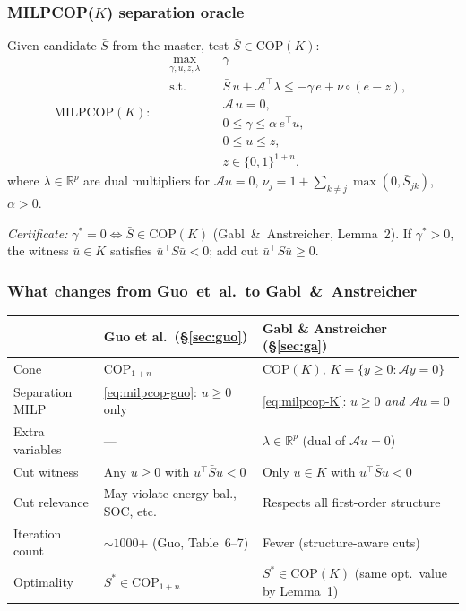\documentclass[11pt]{article}
\theoremstyle{definition}
\newcommand{\R}{\mathbb{R}}
\begin{document}
\subsubsection{MILPCOP($K$) separation oracle}
\label{sec:separation}

Given candidate $\bar S$ from the master, test
$\bar S\in\mathrm{COP}(K)$:
\begin{equation}
\boxed{
\mathrm{MILPCOP}(K):\quad
\begin{aligned}
\max_{\gamma,u,z,\lambda}\quad&\gamma\\
\text{s.t.}\quad
&\bar S\,u+\mathcal{A}^{\top}\lambda
  \le-\gamma\,e+\nu\circ(e-z),\\
&\mathcal{A}\,u=0,\\
&0\le\gamma\le\alpha\,e^{\top}u,\\
&0\le u\le z,\\
&z\in\{0,1\}^{1+n},
\end{aligned}}
\label{eq:milpcop-K}
\end{equation}
where $\lambda\in\R^{p}$ are dual multipliers for
$\mathcal{A}u=0$, $\nu_j=1+\sum_{k\neq j}\max(0,\bar S_{jk})$,
$\alpha>0$.

\emph{Certificate:} $\gamma^{*}=0\Leftrightarrow
\bar S\in\mathrm{COP}(K)$ (Gabl~\&~Anstreicher, Lemma~2).
If $\gamma^{*}>0$, the witness $\bar u\in K$ satisfies
$\bar u^{\top}\bar S\bar u<0$; add cut $\bar u^{\top}S\bar u\ge0$.

\subsubsection{What changes from Guo~et~al.\ to Gabl~\&~Anstreicher}

\begin{center}\small
\begin{tabular}{@{}p{} p{} p{}@{}}
\toprule
& Guo et al.\ (\S\ref{sec:guo}) & Gabl \& Anstreicher (\S\ref{sec:ga})\\
\midrule
Cone & $\mathrm{COP}_{1+n}$ & $\mathrm{COP}(K)$, $K=\{y\ge0:\mathcal{A}y=0\}$\\
Separation MILP & \eqref{eq:milpcop-guo}: $u\ge0$ only
  & \eqref{eq:milpcop-K}: $u\ge0$ \emph{and} $\mathcal{A}u=0$\\
Extra variables & --- & $\lambda\in\R^{p}$ (dual of $\mathcal{A}u=0$)\\
Cut witness & Any $u\ge0$ with $u^{\top}\bar Su<0$
  & Only $u\in K$ with $u^{\top}\bar Su<0$\\
Cut relevance & May violate energy bal., SOC, etc.\
  & Respects all first-order structure\\
Iteration count & $\sim\!1000$+ (Guo, Table~6--7)
  & Fewer (structure-aware cuts)\\
Optimality & $S^{*}\in\mathrm{COP}_{1+n}$
  & $S^{*}\in\mathrm{COP}(K)$ (same opt.\ value by Lemma~1)\\
\bottomrule
\end{tabular}
\end{center}
\end{document}
